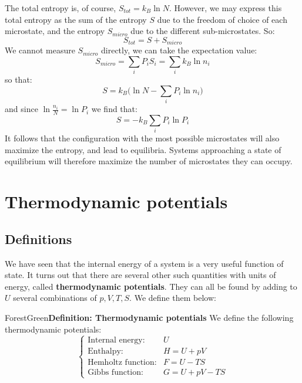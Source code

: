 \documentclass[a4paper,11pt,oneside]{book}
\begin{document}
The total entropy is, of course, $S_{tot} = k_B \ln N$. However, we may express this total entropy as the sum of the entropy $S$ due to the freedom of choice of each microstate, and the entropy $S_{micro}$ due to the different sub-microstates. So:
\begin{equation}
    S_{tot} = S + S_{micro}
\end{equation}
We cannot measure $S_{micro}$ directly, we can take the expectation value:
\begin{equation}
    S_{micro} = \sum_i P_i S_i = \sum_i k_B \ln n_i
\end{equation}
so that:
\begin{equation}
    S = k_B \bigg(\ln N - \sum_i P_i \ln n_i  \bigg)
\end{equation}
and since $\ln \frac{n_i}{N} = \ln P_i$ we find that:
\begin{equation}
    \boxed{S = - k_B \sum_i P_i \ln P_i}
\end{equation}
It follows that the configuration with the most possible microstates will also maximize the entropy, and lead to equilibria. Systems approaching a state of equilibrium will therefore maximize the number of microstates they can occupy. 
\chapter{Thermodynamic potentials}
\section{Definitions}
We have seen that the internal energy of a system is a very useful function of state. It turns out that there are several other such quantities with units of energy, called \textbf{thermodynamic potentials}. They can all be found by adding to $U$ several combinations of $p,V,T,S$. We define them below:
\begin{mybox}{ForestGreen}{\textbf{{Definition}: Thermodynamic potentials}}
We define the following thermodynamic potentials:
\begin{equation}
    \begin{cases}
    \text{Internal energy}: & U\\
    \text{Enthalpy}: & H = U+pV\\
    \text{Hemholtz function}: & F = U-TS\\
    \text{Gibbs function}: & G = U+pV-TS 
    \end{cases}
\end{equation}
\end{mybox}
\end{document}
